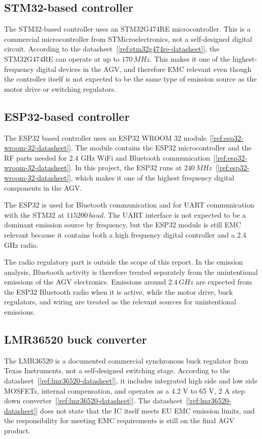 \subsection{STM32-based controller}
The STM32-based controller uses an STM32G474RE microcontroller. This is a commercial
microcontroller from STMicroelectronics, not a self-designed digital circuit. According to
the datasheet~[\ref{ref:stm32g474re-datasheet}], the STM32G474RE can operate at up to \(170\,MHz\). This makes it one of
the highest-frequency digital devices in the AGV, and therefore EMC relevant even though
the controller itself is not expected to be the same type of emission source as the motor
drive or switching regulators.

\subsection{ESP32-based controller}
The ESP32 based controller uses an ESP32 WROOM 32 module~[\ref{ref:esp32-wroom-32-datasheet}]. The module contains the
ESP32 microcontroller and the RF parts needed for 2.4 GHz WiFi and Bluetooth
communication~[\ref{ref:esp32-wroom-32-datasheet}]. In this project, the ESP32 runs at \(240\,MHz\)~[\ref{ref:esp32-wroom-32-datasheet}], which makes it one of
the highest frequency digital components in the AGV.

The ESP32 is used for Bluetooth communication and for UART communication with the
STM32 at \(115200\,baud\). The UART interface is not expected to be a dominant emission
source by frequency, but the ESP32 module is still EMC relevant because it contains both
a high frequency digital controller and a 2.4 GHz radio.

The radio regulatory part is outside the scope of this report. In the emission analysis,
Bluetooth activity is therefore treated separately from the unintentional emissions of the
AGV electronics. Emissions around \(2.4\,GHz\) are expected from the ESP32 Bluetooth
radio when it is active, while the motor drive, buck regulators, and wiring are treated as
the relevant sources for unintentional emissions.

\subsection{LMR36520 buck converter}
The LMR36520 is a documented commercial synchronous buck regulator from Texas
Instruments, not a self-designed switching stage. According to the datasheet~[\ref{ref:lmr36520-datasheet}], it includes
integrated high side and low side MOSFETs, internal compensation, and operates as a
4.2 V to 65 V, 2 A step down converter~[\ref{ref:lmr36520-datasheet}]. The datasheet~[\ref{ref:lmr36520-datasheet}] does not state that the IC itself
meets EU EMC emission limits, and the responsibility for meeting EMC requirements is
still on the final AGV product.

